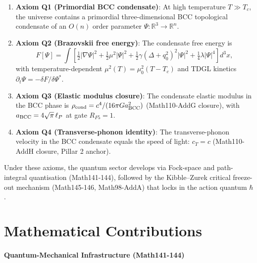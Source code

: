\begin{enumerate}
\item \textbf{Axiom Q1 (Primordial BCC condensate)}: At high temperature $T \gg
  T_c$, the universe contains a primordial three-dimensional BCC topological
  condensate of an $O(n)$ order parameter $\Psi : \mathbb{R}^3 \to \mathbb{R}^n$.

\item \textbf{Axiom Q2 (Brazovskii free energy)}: The condensate free energy is
  \begin{equation}
  F[\Psi] = \int \left[\tfrac{1}{2}|\nabla\Psi|^2 + \tfrac{1}{2}\mu^2|\Psi|^2
  + \tfrac{1}{2}\gamma(\Delta + q_0^2)^2|\Psi|^2 + \tfrac{1}{4}\lambda|\Psi|^4\right]d^3x,
  \label{eq:Fbrazo}
  \end{equation}
  with temperature-dependent $\mu^2(T) = \mu_0^2(T - T_c)$ and TDGL kinetics
  $\partial_t \Psi = -\delta F / \delta \Psi^*$.

\item \textbf{Axiom Q3 (Elastic modulus closure)}: The condensate elastic
  modulus in the BCC phase is $\rho_{\rm cond} = c^4 / (16\pi G a_{\rm BCC}^2)$
  (Math110-AddG closure), with $a_{\rm BCC} = 4\sqrt{\pi}\,\ell_P$ at gate
  $R_{F5} = 1$.

\item \textbf{Axiom Q4 (Transverse-phonon identity)}: The transverse-phonon
  velocity in the BCC condensate equals the speed of light: $c_T = c$
  (Math110-AddH closure, Pillar 2 anchor).
\end{enumerate}

Under these axioms, the quantum sector develops via Fock-space and path-integral
quantisation (Math141-144), followed by the Kibble--Zurek critical freeze-out
mechanism (Math145-146, Math98-AddA) that locks in the action quantum $\hbar$.

\section{Mathematical Contributions}

\paragraph{Quantum-Mechanical Infrastructure (Math141-144)}

